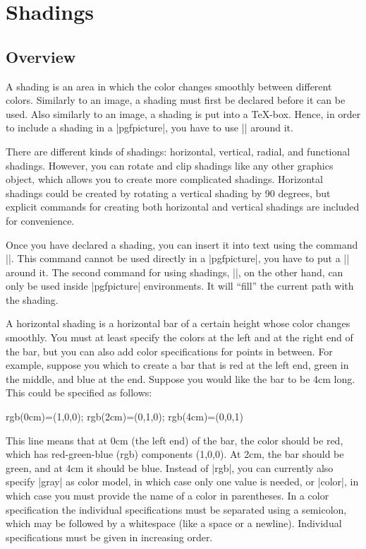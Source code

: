 %
%
%


\section{Shadings}

\label{section-shadings}

\subsection{Overview}

A shading is an area in which the color changes smoothly between different
colors. Similarly to an image, a shading must first be declared before
it can be used. Also similarly to an image, a shading is put into a
\TeX-box. Hence, in order to include a shading in a |{pgfpicture}|,
you have to use |\pgftext| around it.

There are different kinds of shadings: horizontal, vertical, radial,
and functional shadings. However, you can rotate and clip shadings
like any other graphics object, which allows you to create more
complicated shadings. Horizontal shadings could be created by rotating
a vertical shading by 90 degrees, but explicit commands for creating both
horizontal and vertical shadings are included for convenience.

Once you have declared a shading, you can insert it into text using
the command |\pgfuseshading|. This command cannot be used directly in
a |{pgfpicture}|, you have to put a |\pgftext| around it. The second
command for using shadings, |\pgfshadepath|, on the other hand, can
only be used  inside |{pgfpicture}| environments. It will ``fill'' the
current path with the shading.

A horizontal shading is a horizontal bar of a certain height whose
color changes smoothly. You must at least specify the colors at the
left and at the right end of the bar, but you can also add color
specifications for points in between. For example, suppose you
which to create a bar that is red at the left end, green in the
middle, and blue at the end. Suppose you would like the bar to be 4cm
long. This could be specified as follows:
\begin{codeexample}
rgb(0cm)=(1,0,0); rgb(2cm)=(0,1,0); rgb(4cm)=(0,0,1)
\end{codeexample}
This line means that at 0cm (the left end) of the bar, the color
should be red, which has red-green-blue (rgb) components (1,0,0). At
2cm, the bar should be green, and at 4cm it should be blue.
Instead of |rgb|, you can currently also specify |gray| as
color model, in which case only one value is needed, or |color|,
in which case you must provide the name of a color in parentheses. In
a color specification the individual specifications must 
be separated using a semicolon, which may be followed by a whitespace
(like a space or a newline). Individual specifications must be given
in increasing order. 


